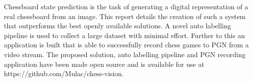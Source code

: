 Chessboard state prediction is the task of generating a digital representation of a real chessboard from an image.
This report details the creation of such a system that outperforms the best openly available solutions.
A novel auto labelling pipeline is used to collect a large dataset with minimal effort.  Further to this an application 
is built that is able to successfully record chess games to PGN from a video stream.  
The proposed solution, auto labelling pipeline and PGN recording application have been made open source and is available for use at 
https://github.com/Mulac/chess-vision.